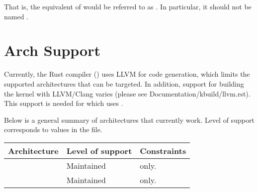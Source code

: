 \documentclass[a4paper,11pt,english]{sphinxmanual}
\begin{document}
That is, the equivalent of  would be referred to as
. In particular, it should not be named
.


\chapter{Arch Support}
\label{\detokenize{arch-support:arch-support}}\label{\detokenize{arch-support::doc}}
Currently, the Rust compiler () uses LLVM for code generation,
which limits the supported architectures that can be targeted. In addition,
support for building the kernel with LLVM/Clang varies (please see
Documentation/kbuild/llvm.rst). This support is needed for 
which uses .

Below is a general summary of architectures that currently work. Level of
support corresponds to  values in the  file.


\begin{savenotes}\sphinxattablestart
\centering
\begin{tabulary}{\linewidth}[t]{|T|T|T|}
\hline
\sphinxstyletheadfamily 
Architecture
&\sphinxstyletheadfamily 
Level of support
&\sphinxstyletheadfamily 
Constraints
\\
\hline
{}
&
Maintained
&
 only.
\\
\hline
{}
&
Maintained
&
 only.
\\
\hline
\end{tabulary}
\par
\sphinxattableend\end{savenotes}



\renewcommand{\indexname}{Index}
\printindex
\end{document}
